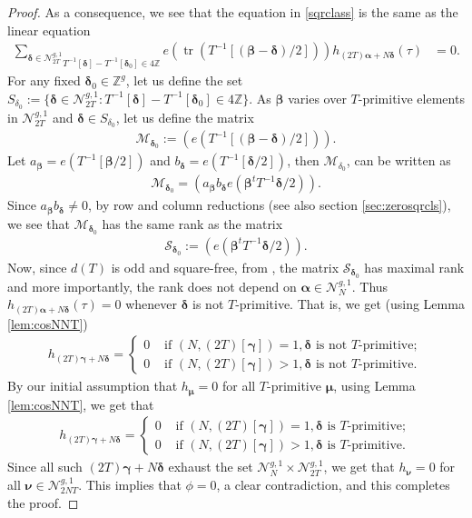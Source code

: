 \documentclass[11pt]{amsart}
\numberwithin{equation}{section}
\newcommand{\mbb}{\mathbb}
\newcommand{\mc}{\mathcal}
\DeclareMathOperator{\tr}{tr}
\newcommand{\z}{\mathbb{Z}}
\begin{document}
\begin{proof}
As a consequence, we see that the equation in \eqref{sqrclass} is the same as the linear equation
\begin{align}
   \underset{T^{-1}[\bm\delta] - T^{-1}[\bm\delta_0] \in 4 \z }{\sum_{\bm\delta\in \mc N_{2T}^{g,1}} } e\left(\tr(T^{-1}[(\bm\beta-\bm\delta)/2])\right) h_{(2T)\bm{\alpha}+N\bm\delta}(\tau)&=0.
\end{align}
For any fixed $\bm\delta_0\in \mbb Z^g$, let us define the set $S_{\delta_0}:=\{\bm\delta \in \mc N_{2T}^{g,1}:T^{-1}[\bm\delta] - T^{-1} [\bm\delta_0] \in 4\mbb Z\}$. As $\bm{\beta}$ varies over $T$-primitive elements in $\mc N_{2T}^{g,1}$ and $\bm\delta\in S_{\delta_0}$, let us define the matrix
\begin{align}
    \mc M_{\bm\delta_0}:=\left(e\left(T^{-1}[(\bm\beta-\bm\delta)/2]\right) \right).
\end{align}
Let $a_{\bm\beta}= e(T^{-1}[\bm\beta/2])$ and $b_{\bm\delta}= e(T^{-1}[\bm\delta/2])$, then $\mc M_{\delta_0}$, can be written as 
\begin{align}
    \mc M_{\bm\delta_0}= \left(a_{\bm\beta} b_{\bm\delta} e\left(\bm{\beta}^{t}T^{-1}\bm\delta/2\right) \right).
\end{align}
Since $a_{\bm{\beta} } b_{\bm\delta}\neq 0$, by row and column reductions (see also section \ref{sec:zerosqrcls}), we see that $\mc M_{\bm\delta_0}$ has the same rank as the matrix
\begin{align}
   \mc S_{\bm\delta_0} :=\left( e\left(\bm{\beta}^{t}T^{-1}\bm\delta/2\right) \right).
\end{align}
Now, since $d(T)$ is odd and square-free, from \cite[Proposition~3.5]{boche-das}, the matrix $\mc S_{\bm\delta_0}$ has maximal rank and more importantly, the rank does not depend on $\bm{\alpha}\in \mc N_{N}^{g,1}$. Thus $h_{(2T)\bm{\alpha}+N\bm\delta}(\tau)=0$ whenever $\bm\delta$ is not $T$-primitive. That is, we get (using Lemma \ref{lem:cosNNT})
\begin{align}
h_{(2T)\bm\gamma+N\bm\delta}=\begin{cases}
 0 & \text{ if }  (N, (2T)[\bm\gamma])=1, \bm\delta \text{ is not } T\text{-primitive};\\
0 & \text{ if }  (N, (2T)[\bm\gamma])>1, \bm\delta \text{ is not } T\text{-primitive}.
\end{cases}   
\end{align}
By our initial assumption that $h_{\bm\mu}=0$ for all $T$-primitive $\bm\mu$, using Lemma \ref{lem:cosNNT}, we get that 
\begin{align}
h_{(2T)\bm\gamma+N\bm\delta}=    \begin{cases}
0 & \text{ if }  (N, (2T)[\bm\gamma])=1, \bm\delta \text{ is }  T\text{-primitive};\\
0 & \text{ if }  (N, (2T)[\bm\gamma])>1, \bm\delta \text{ is }  T\text{-primitive}.
\end{cases}
\end{align}
Since all such $(2T)\bm\gamma+N\bm\delta$ exhaust the set $\mc N_N^{g,1}\times \mc N_{2T}^{g,1}$, we get that $h_{\bm\nu}=0$ for all $\bm\nu\in \mc N_{2NT}^{g,1}$. This implies that $\phi=0$, a clear contradiction, and this completes the proof. 
\end{proof}
\end{document}
